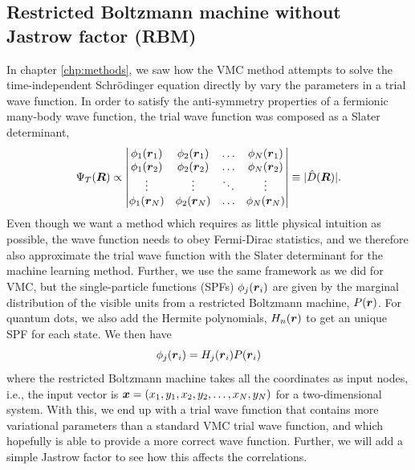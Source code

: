 \subsection{Restricted Boltzmann machine without Jastrow factor (RBM)} \label{sec:rbm}
In chapter \ref{chp:methods}, we saw how the VMC method attempts to solve the time-independent Schrödinger equation directly by vary the parameters in a trial wave function. In order to satisfy the anti-symmetry properties of a fermionic many-body wave function, the trial wave function was composed as a Slater determinant,
\begin{equation}
\Psi_T(\boldsymbol{{R}})\propto
\begin{vmatrix}
\phi_1(\boldsymbol{r}_1) & \phi_2(\boldsymbol{r}_1) & \hdots & \phi_N(\boldsymbol{r}_1)\\
\phi_1(\boldsymbol{r}_2) & \phi_2(\boldsymbol{r}_2) & \hdots & \phi_N(\boldsymbol{r}_2)\\
\vdots & \vdots & \ddots & \vdots \\
\phi_1(\boldsymbol{r}_N) & \phi_2(\boldsymbol{r}_N) & \hdots & \phi_N(\boldsymbol{r}_N)
\end{vmatrix}\equiv|\hat{D}(\boldsymbol{{R}})|.
\end{equation}
Even though we want a method which requires as little physical intuition as possible, the wave function needs to obey Fermi-Dirac statistics, and we therefore also approximate the trial wave function with the Slater determinant for the machine learning method. Further, we use the same framework as we did for VMC, but the single-particle functions (SPFs) $\phi_j(\boldsymbol{{r}}_i)$ are given by the marginal distribution of the visible units from a restricted Boltzmann machine, $P(\boldsymbol{{r}})$. For quantum dots, we also add the Hermite polynomials, $H_n(\boldsymbol{{r}})$ to get an unique SPF for each state. We then have
\begin{equation}
\phi_j(\boldsymbol{{r}}_i)=H_j(\boldsymbol{{r}}_i)P(\boldsymbol{{r}}_i)
\end{equation}
where the restricted Boltzmann machine takes all the coordinates as input nodes, i.e., the input vector is $\boldsymbol{{x}}=(x_1, y_1, x_2, y_2, \hdots, x_N, y_N)$ for a two-dimensional system. With this, we end up with a trial wave function that contains more variational parameters than a standard VMC trial wave function, and which hopefully is able to provide a more correct wave function. Further, we will add a simple Jastrow factor to see how this affects the correlations.

